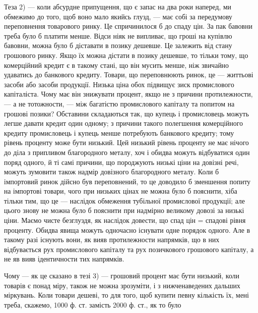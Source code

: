 Теза 2) — коли абсурдне припущення, що є запас на два роки наперед,
ми обмежимо до того, щоб воно мало якийсь глузд, — має собі за передумову
переповнення товарового ринку. Це спричинилося б до спаду цін. За пак бавовни
треба було б платити менше. Відси ніяк не випливає, що гроші на купівлю бавовни,
можна було б діставати в позику дешевше. Це залежить від стану грошового
ринку. Якщо їх можна дістати в позику дешевше, то тільки тому, що комерційний
кредит є в такому стані, що він мусить менше, ніж звичайно удаватись до
банкового кредиту. Товари, що переповнюють ринок, це — життьові засоби або засоби
продукції. Низька ціна обох підвищує зиск промислового капіталіста. Чому
має він знижувати процент, якщо не з причини протилежности, — а не тотожности,
— між багатістю промислового капіталу та попитом на грошові позики?
Обставини складаються так, що купець і промисловець можуть легше давати
кредит один одному; з причини такого полегшення комерційного кредиту промисловець
і купець менше потребують банкового кредиту; тому рівень проценту
може бути низький. Цей низький рівень проценту не має нічого до діла
з припливом благородного металу, хоч і обидва можуть відбуватися один поряд
одного, й ті самі причини, що породжують низькі ціни на довізні речі, можуть
зумовити також надмір довізного благородного металу. Коли б імпортовий ринок
дійсно був переповнений, то це доводило б зменшення попиту на імпортові
товари, чого при низьких цінах не можна було б пояснити, хіба тільки тим,
що це — наслідок обмеження тубільної промислової продукції; але цього знову
не можна було б пояснити при надмірно великому довозі за низькі ціни. Маємо
чисте безглуздя, як наслідок довести, що спад цін = спадові рівня проценту.
Обидва явища можуть одночасно існувати одне порядок одного. Але в такому
разі існують вони, як вияв протилежности напрямків, що в них відбувається рух
промислового капіталу та рух позичкового грошового капіталу, а не яв вияв
ідентичности тих напрямків.

Чому — як це сказано в тезі 3) — грошовий процент має бути низький,
коли товарів є понад міру, також не можна зрозуміти, і з нижченаведених
дальших міркувань. Коли товари дешеві, то для того, щоб купити певну кількість
їх, мені треба, скажемо, 1000 ф. ст. замість 2000 ф. ст., як то було
\parbreak{}  %
